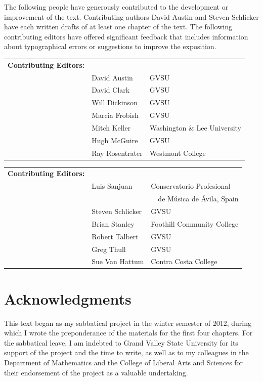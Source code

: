 The following people have generously contributed to the development or improvement of the text.  Contributing authors David Austin and Steven Schlicker have each written drafts of at least one chapter of the text.  The following contributing editors have offered significant feedback that includes information about typographical errors or suggestions to improve the exposition.

\begin{tabular}{l l l}
{\bf Contributing Editors:} & \ & \ \\
\ & David Austin & GVSU \\
\ & David Clark & GVSU \\
\ & Will Dickinson & GVSU \\
\ & Marcia Frobish & GVSU \\
\ & Mitch Keller & Washington \& Lee University \\
\ & Hugh McGuire & GVSU \\
\ & Ray Rosentrater & Westmont College \\
\end{tabular}
\newpage
\begin{tabular}{l l l}
{\bf Contributing Editors:} & \ & \ \\
\ & Luis Sanjuan & Conservatorio Profesional \\
\ & \ & \ \ de M\'{u}sica de \'{A}vila, Spain
\\
\ & Steven Schlicker & GVSU \\
\ & Brian Stanley & Foothill Community College \\
\ & Robert Talbert & GVSU \\
\ & Greg Thull & GVSU \\
\ & Sue Van Hattum & Contra Costa College \\
\end{tabular}


\section*{Acknowledgments}

This text began as my sabbatical project in the winter semester of 2012, during which I wrote the preponderance of the materials for the first four chapters.  For the sabbatical leave, I am indebted to Grand Valley State University for its support of the project and the time to write, as well as to my colleagues in the Department of Mathematics and the College of Liberal Arts and Sciences for their endorsement of the project as a valuable undertaking.

